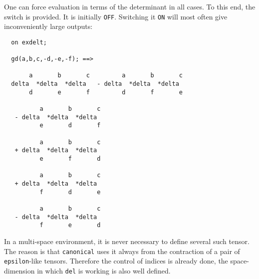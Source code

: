 One can force evaluation in terms of the determinant in all cases.
\hypertarget{switch:EXDELT}{}
To this end, the switch  is provided. It is initially
\texttt{OFF}. Switching it \texttt{ON} will most often give inconveniently large outputs:
\begin{verbatim}
  on exdelt;

  gd(a,b,c,-d,-e,-f); ==>

       a       b       c         a       b       c 
  delta  *delta  *delta   - delta  *delta  *delta
       d       e       f         d       f       e

          a       b       c 
   - delta  *delta  *delta
          e       d       f

          a       b       c 
   + delta  *delta  *delta
          e       f       d

          a       b       c 
   + delta  *delta  *delta
          f       d       e

          a       b       c 
   - delta  *delta  *delta
          f       e       d
\end{verbatim}
In a multi-space environment, it is never necessary to define several
such tensor. The reason is that \texttt{canonical} uses it
always from the contraction of a pair of \texttt{epsilon}-like tensors.
Therefore the  control of indices is already done, the space-dimension
in which \texttt{del} is working  is also well defined.

